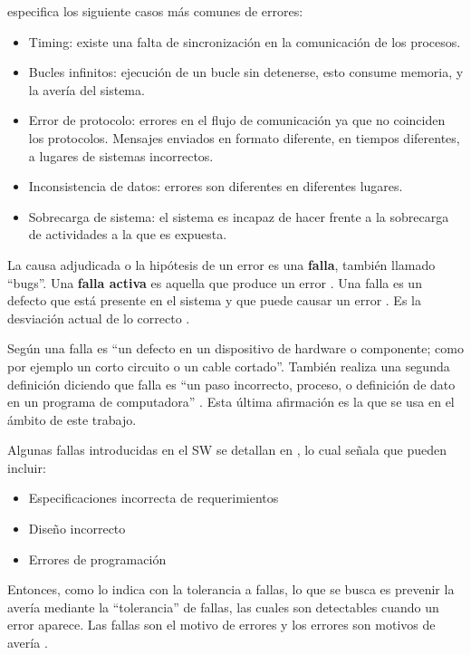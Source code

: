 \cite{Hanmer07} especifica los siguiente casos más comunes de errores:
\begin{itemize}
 \item Timing: existe una falta de sincronización en la comunicación de los procesos.
 \item Bucles infinitos: ejecución de un bucle sin detenerse, esto consume memoria, y la
avería del sistema.
 \item Error de protocolo: errores en el flujo de comunicación ya que no coinciden los
protocolos. Mensajes enviados en formato diferente, en tiempos diferentes, a lugares de sistemas
incorrectos.
 \item Inconsistencia de datos: errores son diferentes en diferentes lugares.
 \item Sobrecarga de sistema: el sistema es incapaz de hacer frente a la sobrecarga de
actividades a la que es expuesta.
\end{itemize}

La causa adjudicada o la hipótesis de un error es una \textbf{falla}, también llamado ``bugs''. Una
\textbf{falla activa} es aquella que produce un error \citep{Pullum01}. Una falla es un defecto que está
presente en el sistema y que puede causar un error \citep{Hanmer07}. Es la desviación actual de lo
correcto \cite{Hanmer07}.

Según \cite{IEEE610.12} una falla es ``un defecto en un dispositivo de hardware o componente; como
por ejemplo un corto circuito o un cable cortado''. También realiza una segunda definición diciendo
que falla es ``un paso incorrecto, proceso, o definición de dato en un programa de computadora''
\cite{IEEE610.12}. Esta última afirmación es la que se usa en el ámbito de este trabajo.

Algunas fallas introducidas en el \ac{SW} se detallan en \cite{Hanmer07}, lo cual señala que
pueden incluir:
\begin{itemize}
 \item Especificaciones incorrecta de requerimientos
 \item Diseño incorrecto
 \item Errores de programación
\end{itemize}

Entonces, como lo indica \cite{Pullum01} con la tolerancia a fallas, lo que se busca es prevenir la
avería mediante la ``tolerancia'' de fallas, las cuales son detectables cuando un error aparece.
Las fallas son el motivo de errores y los errores son motivos de avería \citep{FTDesign}.

